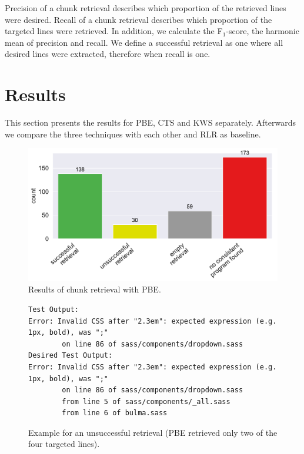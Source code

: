 Precision of a chunk retrieval describes which proportion of the retrieved lines were desired.
Recall of a chunk retrieval describes which proportion of the targeted lines were retrieved.
In addition, we calculate the F$_{1}$-score, the harmonic mean of precision and recall.
We define a successful retrieval as one where all desired lines were extracted, therefore when recall is one.



\section{Results}
This section presents the results for PBE, CTS and KWS separately.
Afterwards we compare the three techniques with each other and RLR as baseline.

\begin{figure}[!t]
		\centering
		\includegraphics[width=0.75\columnwidth, clip]{img/big-study/failure-reason-pbe.pdf}
		\caption{Results of chunk retrieval with PBE.}
		\label{fig:failure-reason-PBE}
\end{figure}

\begin{figure}[!t]
  \centering
  \begin{lstlisting}[breaklines=true]
Test Output:
Error: Invalid CSS after "2.3em": expected expression (e.g. 1px, bold), was ";"
        on line 86 of sass/components/dropdown.sass   
Desired Test Output:
Error: Invalid CSS after "2.3em": expected expression (e.g. 1px, bold), was ";"
        on line 86 of sass/components/dropdown.sass
        from line 5 of sass/components/_all.sass
        from line 6 of bulma.sass
  \end{lstlisting}  
  \caption{Example for an unsuccessful retrieval (PBE retrieved only two of the four targeted lines).}
  \label{lst:pbe-unsuccessful}
\end{figure}


